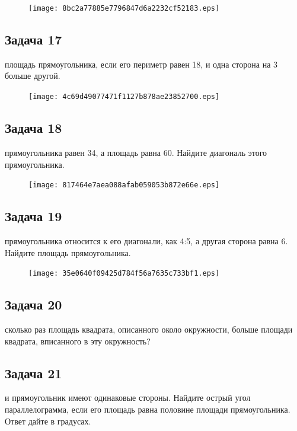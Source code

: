\documentclass[a4paper,10pt]{article} %
\begin{document}
\begin{spacing}{1.0}
{\vspace{1.5cm}

\begin{figure}{\texttt{[image: 8bc2a77885e7796847d6a2232cf52183.eps]}}\end{figure}
\subsection*{Задача 17}
 площадь прямоугольника, если его периметр равен 18, и одна сторона на 3 больше другой.

\vspace{1.5cm}

\begin{figure}{\texttt{[image: 4c69d49077471f1127b878ae23852700.eps]}}\end{figure}
\subsection*{Задача 18}
 прямоугольника равен 34, а площадь равна 60. Найдите диагональ этого прямоугольника. 

\vspace{1.5cm}

\begin{figure}{\texttt{[image: 817464e7aea088afab059053b872e66e.eps]}}\end{figure}
\subsection*{Задача 19}
 прямоугольника относится к его диагонали, как 4:5, а другая сторона равна 6. Найдите площадь прямоугольника. 

\vspace{1.5cm}

\begin{figure}{\texttt{[image: 35e0640f09425d784f56a7635c733bf1.eps]}}\end{figure}
\subsection*{Задача 20}
 сколько раз площадь квадрата, описанного около окружности, больше площади квадрата, вписанного в эту окружность?

\vspace{1.5cm}

\subsection*{Задача 21}
 и прямоугольник имеют одинаковые стороны. Найдите острый угол параллелограмма, если его площадь равна половине площади прямоугольника. Ответ дайте в градусах.

}
\end{spacing}
\end{document}

